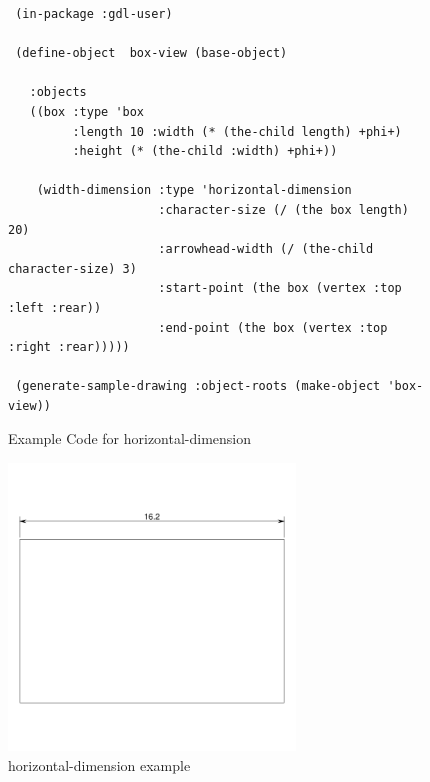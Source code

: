 \documentclass [11pt]{book}
\begin{document}
\begin{itemize}
\begin{figure}
\begin{lrbox}{\boxedverb}
\begin{minipage}{\linewidth}
{\small

\begin{verbatim}          
 (in-package :gdl-user)

 (define-object  box-view (base-object)
   
   :objects
   ((box :type 'box
         :length 10 :width (* (the-child length) +phi+)
         :height (* (the-child :width) +phi+))
   
    (width-dimension :type 'horizontal-dimension
                     :character-size (/ (the box length) 20)
                     :arrowhead-width (/ (the-child character-size) 3)
                     :start-point (the box (vertex :top :left :rear))
                     :end-point (the box (vertex :top :right :rear)))))

 (generate-sample-drawing :object-roots (make-object 'box-view)) 
\end{verbatim}}
\end{minipage}
\end{lrbox}
\fbox{\usebox{\boxedverb}}

\caption{Example Code for horizontal-dimension}

\label{fig:example-code-horizontal-dimension}

\end{figure}

\begin{figure}
\begin{center}
\includegraphics[width=3in,height=3in]{../images/example-horizontal-dimension.pdf}
\end{center}

\caption{horizontal-dimension example}


\end{figure}
\end{itemize}
\end{document}
